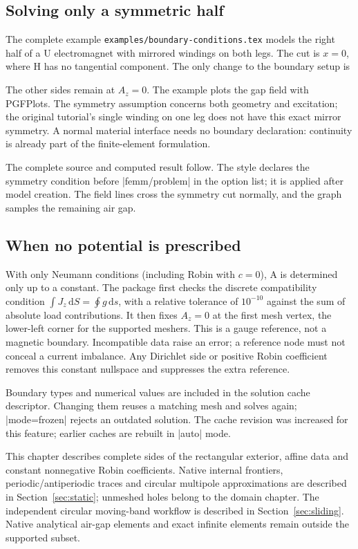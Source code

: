 \subsection{Solving only a symmetric half}
The complete example \texttt{examples/boundary-conditions.tex} models the
right half of a U electromagnet with mirrored windings on both legs.
The cut is $x=0$, where H has no tangential component. The only change to
the boundary setup is
\begin{codeexample}
\begin{tikzpicture}[femm/problem={
  xmin=0,xmax=85,ymin=-75,ymax=95,mesh size=4},
  femm/boundary={side=left,type=neumann}]
\end{tikzpicture}
\end{codeexample}
The other sides remain at $A_z=0$. The example plots the gap field with
PGFPlots. The symmetry assumption concerns both geometry and excitation;
the original tutorial's single winding on one leg does not have this
exact mirror symmetry. A normal material interface needs no boundary
declaration: continuity is already part of the finite-element formulation.

The complete source and computed result follow. The style declares the
symmetry condition before |femm/problem| in the option list; it is applied
after model creation. The field lines cross the symmetry cut normally,
and the graph samples the remaining air gap.

\subsection{When no potential is prescribed}
With only Neumann conditions (including Robin with $c=0$), A is determined
only up to a constant. The package first checks the discrete compatibility
condition $\int J_z\,\mathrm dS=\oint g\,\mathrm ds$, with a relative
tolerance of $10^{-10}$ against the sum of absolute load contributions.
It then fixes $A_z=0$ at the first mesh vertex, the lower-left corner for
the supported meshers. This is a gauge reference, not a magnetic boundary.
Incompatible data raise an error; a reference node must not conceal a
current imbalance. Any Dirichlet side or positive Robin coefficient
removes this constant nullspace and suppresses the extra reference.

Boundary types and numerical values are included in the solution cache
descriptor. Changing them reuses a matching mesh and solves again;
|mode=frozen| rejects an outdated solution. The cache revision was
increased for this feature; earlier caches are rebuilt in |auto| mode.

This chapter describes complete sides of the rectangular exterior, affine data
and constant nonnegative Robin coefficients. Native internal frontiers,
periodic/antiperiodic traces and circular multipole approximations are described
in Section~\ref{sec:static}; unmeshed holes belong to the domain chapter.
The independent circular moving-band workflow is described in
Section~\ref{sec:sliding}. Native analytical air-gap elements and exact
infinite elements remain outside the supported subset.
